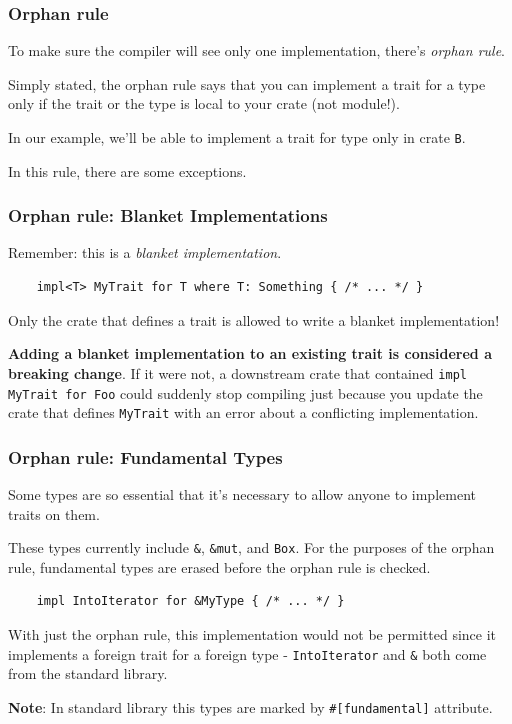 \documentclass[aspectratio=1610,t]{beamer}
\begin{document}

\begin{frame}[fragile]
\frametitle{Orphan rule}
To make sure the compiler will see only one implementation, there's \textit{orphan rule}.

Simply stated, the orphan rule says that you can implement a trait for a type only if the trait or the type is local to your crate (not module!).

In our example, we'll be able to implement a trait for type only in crate \texttt{B}.

In this rule, there are some exceptions.
\end{frame}


\begin{frame}[fragile]
\frametitle{Orphan rule: Blanket Implementations}
Remember: this is a \textit{blanket implementation}.

\begin{verbatim}
    impl<T> MyTrait for T where T: Something { /* ... */ }
\end{verbatim}

Only the crate that defines a trait is allowed to write a blanket implementation!

\textbf{Adding a blanket implementation to an existing trait is considered a breaking change}. If it were not, a downstream crate that contained \texttt{impl MyTrait for Foo} could suddenly stop compiling just because you update the crate that defines \texttt{MyTrait} with an error about a conflicting implementation.
\end{frame}


\begin{frame}[fragile]
\frametitle{Orphan rule: Fundamental Types}
Some types are so essential that it's necessary to allow anyone to implement traits on them.

These types currently include \texttt{\&}, \texttt{\&mut}, and \texttt{Box}. For the purposes of the orphan rule, fundamental types are erased before the orphan rule is checked.

\begin{verbatim}
    impl IntoIterator for &MyType { /* ... */ }
\end{verbatim}

With just the orphan rule, this implementation would not be permitted since it implements a foreign trait for a foreign type - \texttt{IntoIterator} and \texttt{\&} both come from the standard library.

\textbf{Note}: In standard library this types are marked by \texttt{\#[fundamental]} attribute.
\end{frame}
\end{document}
